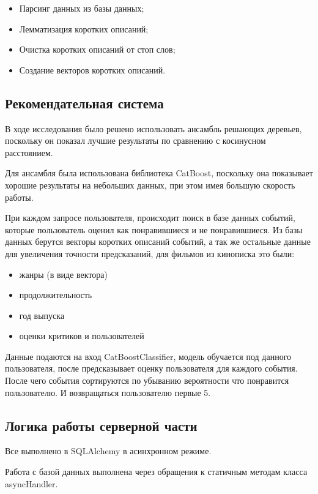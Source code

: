 \begin{itemize}
	\item Парсинг данных из базы данных;
	\item Лемматизация коротких описаний;
	\item Очистка коротких описаний от стоп слов;
	\item Создание векторов коротких описаний.
\end{itemize}

\subsection{Рекомендательная система}

В ходе исследования было решено использовать ансамбль решающих деревьев, поскольку он показал лучшие результаты по
сравнению с косинусном расстоянием.

Для ансамбля была использована библиотека CatBoost, поскольку она показывает хорошие результаты на небольших данных,
при этом имея большую скорость работы.

При каждом запросе пользователя, происходит поиск в базе данных событий, которые пользователь оценил как понравившиеся
и не понравившиеся.
Из базы данных берутся векторы коротких описаний событий, а так же остальные данные для увеличения точности
предсказаний, для фильмов из кинописка это были:

\begin{itemize}
	\item жанры (в виде вектора)
	\item продолжительность
	\item год выпуска
	\item оценки критиков и пользователей
\end{itemize}

Данные подаются на вход CatBoostClassifier, модель обучается под данного пользователя, после предсказывает оценку
пользователя для каждого события.
После чего события сортируются по убыванию вероятности что понравится пользователю.
И возвращаться пользователю первые 5.

\subsection{Логика работы серверной части}
Все выполнено в SQLAlchemy в асинхронном режиме.

Работа с базой данных выполнена через обращения к статичным методам класса asyncHandler.

